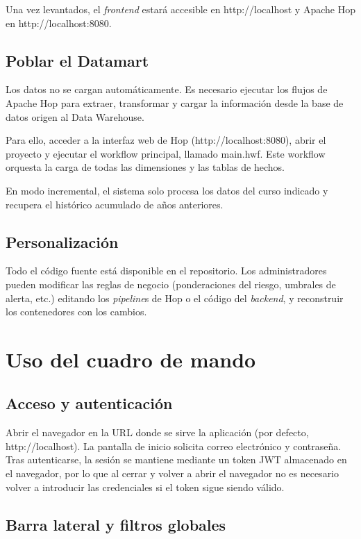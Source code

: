 Una vez levantados, el \textit{frontend} estará accesible en http://localhost y Apache Hop en http://localhost:8080.

\subsection{Poblar el Datamart}

Los datos no se cargan automáticamente. Es necesario ejecutar los flujos de Apache Hop para extraer, transformar y cargar la información desde la base de datos origen al Data Warehouse.

Para ello, acceder a la interfaz web de Hop (http://localhost:8080), abrir el proyecto y ejecutar el workflow principal, llamado main.hwf. Este workflow orquesta la carga de todas las dimensiones y las tablas de hechos.

En modo incremental, el sistema solo procesa los datos del curso indicado y recupera el histórico acumulado de años anteriores.

\subsection{Personalización}

Todo el código fuente está disponible en el repositorio. Los administradores pueden modificar las reglas de negocio (ponderaciones del riesgo, umbrales de alerta, etc.) editando los \textit{pipeline}s de Hop o el código del \textit{backend}, y reconstruir los contenedores con los cambios.

\section{Uso del cuadro de mando}

\subsection{Acceso y autenticación}

Abrir el navegador en la URL donde se sirve la aplicación (por defecto, http://localhost). La pantalla de inicio solicita correo electrónico y contraseña. Tras autenticarse, la sesión se mantiene mediante un token JWT almacenado en el navegador, por lo que al cerrar y volver a abrir el navegador no es necesario volver a introducir las credenciales si el token sigue siendo válido.

\subsection{Barra lateral y filtros globales}

